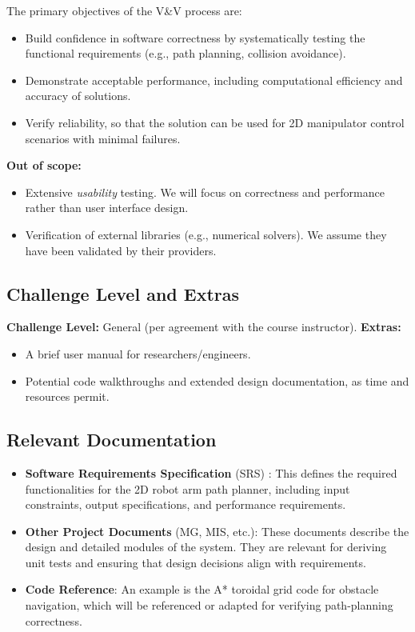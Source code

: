 \documentclass[12pt, titlepage]{article}
\begin{document}
The primary objectives of the V\&V process are:
\begin{itemize}
    \item Build confidence in software correctness by systematically testing the functional requirements (e.g., path planning, collision avoidance).
    \item Demonstrate acceptable performance, including computational efficiency and accuracy of solutions.
    \item Verify reliability, so that the solution can be used for 2D manipulator control scenarios with minimal failures.
\end{itemize}
\textbf{Out of scope:}
\begin{itemize}
    \item Extensive \emph{usability} testing. We will focus on correctness and performance rather than user interface design.
    \item Verification of external libraries (e.g., numerical solvers). We assume they have been validated by their providers.
\end{itemize}

\subsection{Challenge Level and Extras}
\textbf{Challenge Level:} General (per agreement with the course instructor).
\textbf{Extras:}
\begin{itemize}
    \item A brief user manual for researchers/engineers.
    \item Potential code walkthroughs and extended design documentation, as time and resources permit.
\end{itemize}

\subsection{Relevant Documentation}
\begin{itemize}
  \item \textbf{Software Requirements Specification} (SRS) :
  This defines the required functionalities for the 2D robot arm path planner, including input constraints, output specifications, and performance requirements.
  \item \textbf{Other Project Documents} (MG, MIS, etc.):
  These documents describe the design and detailed modules of the system. They are relevant for deriving unit tests and ensuring that design decisions align with requirements.
  \item \textbf{Code Reference}:
  An example is the A* toroidal grid code for obstacle navigation, which will be referenced or adapted for verifying path-planning correctness.
\end{itemize}
\end{document}
